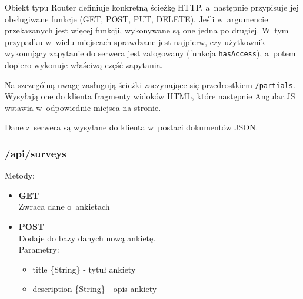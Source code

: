 \documentclass[8pt,a4paper,notitlepage]{article}
\begin{document}
Obiekt typu Router definiuje konkretną ścieżkę HTTP, a~następnie przypisuje jej obsługiwane funkcje (GET, POST, PUT, DELETE). Jeśli w~argumencie przekazanych jest więcej funkcji, wykonywane są one jedna po drugiej. W~tym przypadku w~wielu miejscach sprawdzane jest najpierw, czy użytkownik wykonujący zapytanie do serwera jest zalogowany (funkcja \texttt{hasAccess}), a~potem dopiero wykonuje właściwą część zapytania.
\par Na szczególną uwagę zasługują ścieżki zaczynające się przedrostkiem \texttt{/partials}. Wysyłają one do klienta fragmenty widoków HTML, które następnie Angular.JS wstawia w~odpowiednie miejsca na stronie.
\par Dane z~serwera są wysyłane do klienta w~postaci dokumentów JSON.

\subsubsection{/api/surveys}
Metody:
\begin{itemize}
\item \textbf{GET} \\ Zwraca dane o~ankietach 
\item \textbf{POST} \\ Dodaje do bazy danych nową ankietę. \\ Parametry:
	\begin{itemize}
	\item title \{String\} - tytuł ankiety
	\item description \{String\} - opis ankiety
	\end{itemize}
\end{itemize}
\newpage
\end{document}

